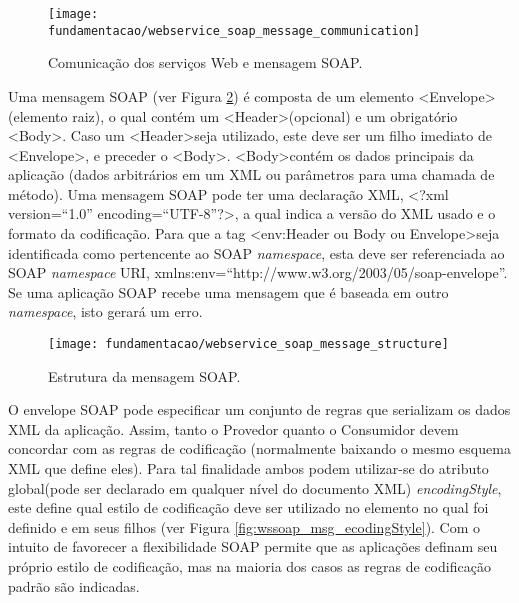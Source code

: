 \begin{figure}[!htb] \centering 
  \centering
  \texttt{[image: fundamentacao/webservice\_soap\_message\_communication]} 
  \caption{Comunicação dos serviços Web e mensagem SOAP.\cite{Papazoglou:2008}} 
  \label{fig:wsmodelsoap_communication_msg}
\end{figure}

Uma mensagem SOAP (ver Figura \ref{fig:wssoap_msg}) é composta de um elemento \textless Envelope\textgreater (elemento raiz), o qual contém um \textless Header\textgreater (opcional) e um obrigatório \textless Body\textgreater. Caso um \textless Header\textgreater seja utilizado, este deve ser um filho imediato de \textless Envelope\textgreater, e preceder o \textless Body\textgreater. \textless Body\textgreater contém os dados principais da aplicação (dados arbitrários em um XML ou parâmetros para uma chamada de método). Uma mensagem SOAP pode ter uma declaração XML, \textless ?xml version=``1.0'' encoding=``UTF-8''?\textgreater, a qual indica a versão do XML usado e o formato da codificação. Para que a tag \textless env:Header ou Body ou Envelope\textgreater seja identificada como pertencente ao SOAP \textit{namespace}, esta deve ser referenciada ao SOAP \textit{namespace} URI, xmlns:env=``http://www.w3.org/2003/05/soap-envelope''. Se uma aplicação SOAP recebe uma mensagem que é baseada em outro \textit{namespace}, isto gerará um erro.\cite{Papazoglou:2008}

\begin{figure}[!htb] \centering
  \centering
  \texttt{[image: fundamentacao/webservice\_soap\_message\_structure]} 
  \caption{Estrutura da mensagem SOAP.\cite{Papazoglou:2008}} 
  \label{fig:wssoap_msg}
\end{figure}

O envelope SOAP pode especificar um conjunto de regras que serializam os dados XML da aplicação. Assim, tanto o Provedor quanto o Consumidor devem concordar com as regras de codificação (normalmente baixando o mesmo esquema XML que define eles). Para tal finalidade ambos podem utilizar-se do atributo global(pode ser declarado em qualquer nível do documento XML) \textit{encodingStyle}, este define qual estilo de codificação deve ser utilizado no elemento no qual foi definido e em seus filhos (ver Figura \ref{fig:wssoap_msg_ecodingStyle}). Com o intuito de favorecer a flexibilidade SOAP permite que as aplicações definam seu próprio estilo de codificação, mas na maioria dos casos as regras de codificação padrão são indicadas.\cite{Papazoglou:2008}

